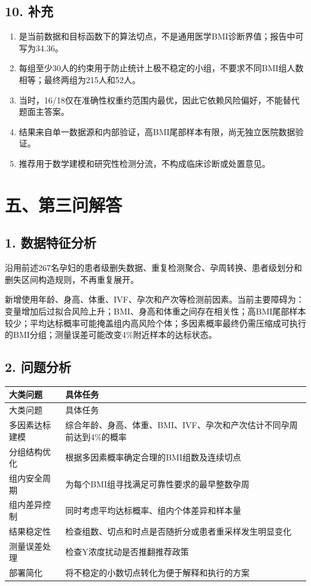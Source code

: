 \documentclass[UTF8,12pt,a4paper]{ctexart}
\begin{document}
\subsection{10. 补充}
\begin{enumerate}
\item \textsf{}是当前数据和目标函数下的算法切点，不是通用医学BMI诊断界值；报告中可写为34.36。
\item 每组至少30人的约束用于防止统计上极不稳定的小组，不要求不同BMI组人数相等；最终两组为215人和52人。
\item 当\textsf{}时，16/18仅在准确性权重约\textsf{}范围内最优，因此它依赖风险偏好，不能替代题面主答案。
\item 结果来自单一数据源和内部验证，高BMI尾部样本有限，尚无独立医院数据验证。
\item 推荐用于数学建模和研究性检测分流，不构成临床诊断或处置意见。
\end{enumerate}

\section{五、第三问解答}
\subsection{1. 数据特征分析}
沿用前述267名孕妇的患者级删失数据、重复检测聚合、孕周转换、患者级划分和删失区间构造规则，不再重复展开。

新增使用年龄、身高、体重、IVF、孕次和产次等检测前因素。当前主要障碍为：变量增加后过拟合风险上升；BMI、身高和体重之间存在相关性；高BMI尾部样本较少；平均达标概率可能掩盖组内高风险个体；多因素概率最终仍需压缩成可执行的BMI分组；测量误差可能改变4\%附近样本的达标状态。

\subsection{2. 问题分析}
\begingroup
\footnotesize
\setlength{\tabcolsep}{1.5pt}
\begin{longtable}{|>{\raggedright\arraybackslash}p{}|>{\raggedright\arraybackslash}p{}|}
\hline
大类问题 & 具体任务 \\ \hline
\endfirsthead
\hline
大类问题 & 具体任务 \\ \hline
\endhead
多因素达标建模 & 综合年龄、身高、体重、BMI、IVF、孕次和产次估计不同孕周前达到4\%的概率 \\ \hline
分组结构优化 & 根据多因素概率确定合理的BMI组数及连续切点 \\ \hline
组内安全周期 & 为每个BMI组寻找满足可靠性要求的最早整数孕周 \\ \hline
组内差异控制 & 同时考虑平均达标概率、组内个体差异和样本量 \\ \hline
结果稳定性 & 检查组数、切点和时点是否随折分或患者重采样发生明显变化 \\ \hline
测量误差处理 & 检查Y浓度扰动是否推翻推荐政策 \\ \hline
部署简化 & 将不稳定的小数切点转化为便于解释和执行的方案 \\ \hline
\end{longtable}
\endgroup
\end{document}
